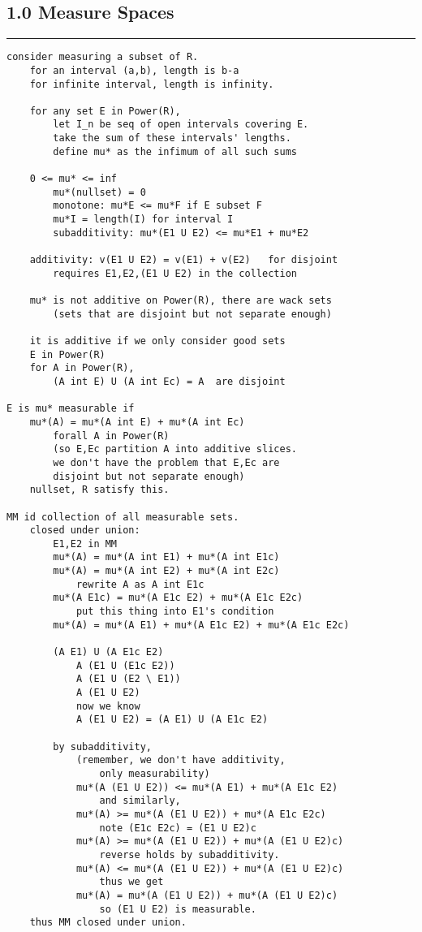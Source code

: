 \documentclass{article}
\begin{document}
\begin{flushleft}
\section*{1.0 Measure Spaces}
\bigbreak
\hrule
\bigbreak

\begin{verbatim}
consider measuring a subset of R.
    for an interval (a,b), length is b-a
    for infinite interval, length is infinity.

    for any set E in Power(R),
        let I_n be seq of open intervals covering E. 
        take the sum of these intervals' lengths.
        define mu* as the infimum of all such sums

    0 <= mu* <= inf 
        mu*(nullset) = 0
        monotone: mu*E <= mu*F if E subset F 
        mu*I = length(I) for interval I
        subadditivity: mu*(E1 U E2) <= mu*E1 + mu*E2

    additivity: v(E1 U E2) = v(E1) + v(E2)   for disjoint
        requires E1,E2,(E1 U E2) in the collection

    mu* is not additive on Power(R), there are wack sets
        (sets that are disjoint but not separate enough)

    it is additive if we only consider good sets
    E in Power(R)
    for A in Power(R),
        (A int E) U (A int Ec) = A  are disjoint 

E is mu* measurable if 
    mu*(A) = mu*(A int E) + mu*(A int Ec) 
        forall A in Power(R)
        (so E,Ec partition A into additive slices.
        we don't have the problem that E,Ec are 
        disjoint but not separate enough)
    nullset, R satisfy this.

MM id collection of all measurable sets. 
    closed under union:
        E1,E2 in MM 
        mu*(A) = mu*(A int E1) + mu*(A int E1c)
        mu*(A) = mu*(A int E2) + mu*(A int E2c)
            rewrite A as A int E1c
        mu*(A E1c) = mu*(A E1c E2) + mu*(A E1c E2c)
            put this thing into E1's condition
        mu*(A) = mu*(A E1) + mu*(A E1c E2) + mu*(A E1c E2c)

        (A E1) U (A E1c E2) 
            A (E1 U (E1c E2))
            A (E1 U (E2 \ E1))
            A (E1 U E2)
            now we know 
            A (E1 U E2) = (A E1) U (A E1c E2) 

        by subadditivity, 
            (remember, we don't have additivity, 
                only measurability)
            mu*(A (E1 U E2)) <= mu*(A E1) + mu*(A E1c E2)
                and similarly,
            mu*(A) >= mu*(A (E1 U E2)) + mu*(A E1c E2c)
                note (E1c E2c) = (E1 U E2)c
            mu*(A) >= mu*(A (E1 U E2)) + mu*(A (E1 U E2)c)
                reverse holds by subadditivity.
            mu*(A) <= mu*(A (E1 U E2)) + mu*(A (E1 U E2)c)
                thus we get
            mu*(A) = mu*(A (E1 U E2)) + mu*(A (E1 U E2)c)
                so (E1 U E2) is measurable.
    thus MM closed under union.


\end{verbatim}
\end{flushleft}
\end{document}
